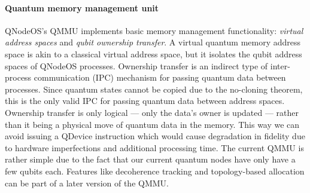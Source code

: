 \paragraph{Quantum memory management unit}

QNodeOS's QMMU implements basic memory management functionality: \emph{virtual address spaces} and
\emph{qubit ownership transfer}. A virtual quantum memory address space is akin to a classical
virtual address space, but it isolates the qubit address spaces of QNodeOS processes. Ownership
transfer is an indirect type of inter-process communication (IPC) mechanism for passing quantum data
between processes. Since quantum states cannot be copied due to the no-cloning theorem, this is the
only valid IPC for passing quantum data between address spaces. Ownership transfer is only logical
--- only the data's owner is updated --- rather than it being a physical move of quantum data in the
memory. This way we can avoid issuing a QDevice instruction which would cause degradation in
fidelity due to hardware imperfections and additional processing time. The current QMMU is rather
simple due to the fact that our current quantum nodes have only have a few qubits each. Features
like decoherence tracking and topology-based allocation can be part of a later version of the QMMU.

\printbibliography[heading=subbibintoc,title={References}]
